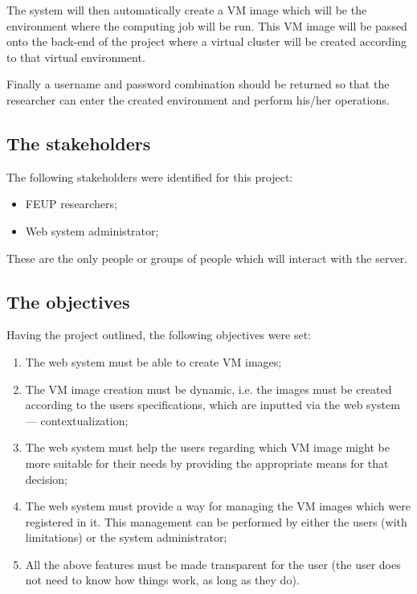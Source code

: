 The system will then automatically create a VM image which will be the environment where the computing job will be run. This VM image will be passed onto the back-end of the project where a virtual cluster will be created according to that virtual environment.

Finally a username and password combination should be returned so that the researcher can enter the created environment and perform his/her operations. 

\subsection{The stakeholders}\label{subsec:stakeholders}

The following stakeholders were identified for this project:

\begin{itemize}
\item FEUP researchers;
\item Web system administrator;
\end{itemize} 

These are the only people or groups of people which will interact with the server.

\subsection{The objectives}\label{subsec:objectives}

Having the project outlined, the following objectives were set:

\begin{enumerate}
\item The web system must be able to create VM images;
\item The VM image creation must be dynamic, i.e. the images must be created according to the users specifications, which are inputted via the web system --- contextualization;
\item The web system must help the users regarding which VM image might be more suitable for their needs by providing the appropriate means for that decision;
\item The web system must provide a way for managing the VM images which were registered in it. This management can be performed by either the users (with limitations) or the system administrator;
\item All the above features must be made transparent for the user (the user does not need to know how things work, as long as they do).
\end{enumerate}

